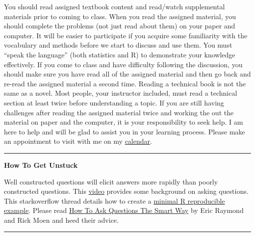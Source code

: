 \documentclass[
]{article}
\begin{document}
You should read assigned textbook content and read/watch supplemental
materials prior to coming to class. When you read the assigned material,
you should complete the problems (not just read about them) on your
paper and computer. It will be easier to participate if you acquire some
familiarity with the vocabulary and methods before we start to discuss
and use them. You must ``speak the language'' (both statistics and R) to
demonstrate your knowledge effectively. If you come to class and have
difficulty following the discussion, you should make sure you have read
all of the assigned material and then go back and re-read the assigned
material a second time. Reading a technical book is not the same as a
novel. Most people, your instructor included, must read a technical
section at least twice before understanding a topic. If you are still
having challenges after reading the assigned material twice and working
the out the material on paper and the computer, it is your
responsibility to seek help. I am here to help and will be glad to
assist you in your learning process. Please make an appointment to visit
with me on my
\href{https://calendar.app.google/FS1gx8qdFUkN6Z9Y8}{calendar}.

\begin{center}\rule{0.5\linewidth}{0.5pt}\end{center}

\textbf{How To Get Unstuck}

Well constructed questions will elicit answers more rapidly than poorly
constructed questions. This
\href{https://www.youtube.com/watch?v=ZFaWxxzouCY\&list=PLjTlxb-wKvXNSDfcKPFH2gzHGyjpeCZmJ\&index=3}{video}
provides some background on asking questions. This stackoverflow thread
details how to create a
\href{http://stackoverflow.com/questions/5963269/how-to-make-a-great-r-reproducible-example/5963610\#5963610}{minimal
R reproducible example}. Please read
\href{http://www.catb.org/~esr/faqs/smart-questions.html}{How To Ask
Questions The Smart Way} by Eric Raymond and Rick Moen and heed their
advice.

\begin{center}\rule{0.5\linewidth}{0.5pt}\end{center}
\end{document}
